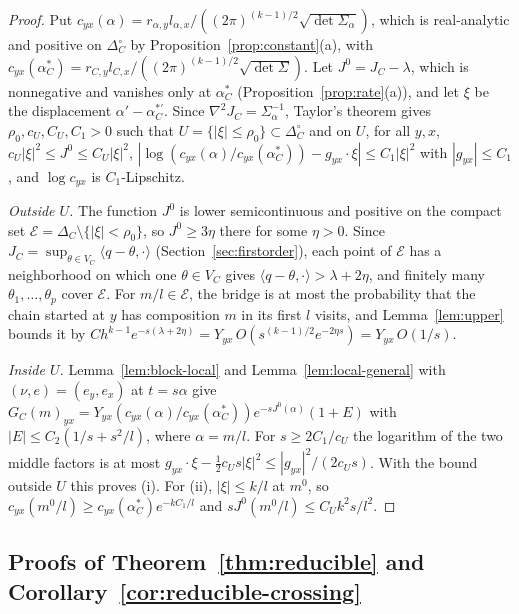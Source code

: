 \begin{proof}
Put $c_{yx}(\alpha)=r_{\alpha,y}l_{\alpha,x}/((2\pi)^{(k-1)/2}\sqrt{\det\Sigma_\alpha})$, which is
real-analytic and positive on $\Delta_C^\circ$ by Proposition~\ref{prop:constant}(a), with
$c_{yx}(\alpha^*_C)=r_{C,y}l_{C,x}/((2\pi)^{(k-1)/2}\sqrt{\det\Sigma})$. Let $J^0=J_C-\lambda$, which is
nonnegative and vanishes only at $\alpha^*_C$ (Proposition~\ref{prop:rate}(a)), and let $\xi$ be
the displacement $\alpha'-\alpha^{*\prime}_C$. Since $\nabla^2J_C=\Sigma_\alpha^{-1}$, Taylor's
theorem gives $\rho_0,c_U,C_U,C_1>0$ such that $U=\{|\xi|\le\rho_0\}\subset\Delta_C^\circ$ and on
$U$, for all $y,x$, $c_U|\xi|^2\le J^0\le C_U|\xi|^2$,
$|\log(c_{yx}(\alpha)/c_{yx}(\alpha^*_C))-g_{yx}\cdot\xi|\le C_1|\xi|^2$ with $|g_{yx}|\le C_1$,
and $\log c_{yx}$ is $C_1$-Lipschitz.

\emph{Outside $U$.} The function $J^0$ is lower semicontinuous and positive on the compact set
$\mathcal E=\Delta_C\setminus\{|\xi|<\rho_0\}$, so $J^0\ge3\eta$ there for some $\eta>0$. Since
$J_C=\sup_{\theta\in V_C}\langle q-\theta,\cdot\rangle$ (Section~\ref{sec:firstorder}), each
point of $\mathcal E$ has a neighborhood on which one $\theta\in V_C$ gives
$\langle q-\theta,\cdot\rangle>\lambda+2\eta$, and finitely many $\theta_1,\dots,\theta_p$ cover
$\mathcal E$. For $m/l\in\mathcal E$, the bridge is at most the probability that the chain started at $y$ has
composition $m$ in its first $l$ visits, and Lemma~\ref{lem:upper} bounds it by
$Ch^{k-1}e^{-s(\lambda+2\eta)}=Y_{yx}\,O(s^{(k-1)/2}e^{-2\eta s})=Y_{yx}\,O(1/s)$.

\emph{Inside $U$.} Lemma~\ref{lem:block-local} and Lemma~\ref{lem:local-general} with
$(\nu,e)=(e_y,e_x)$ at $t=s\alpha$ give
$G_C(m)_{yx}=Y_{yx}(c_{yx}(\alpha)/c_{yx}(\alpha^*_C))e^{-sJ^0(\alpha)}(1+E)$ with
$|E|\le C_2(1/s+s^2/l)$, where $\alpha=m/l$. For $s\ge2C_1/c_U$ the logarithm of the two middle
factors is at most $g_{yx}\cdot\xi-\frac12c_Us|\xi|^2\le|g_{yx}|^2/(2c_Us)$. With the bound outside
$U$ this proves (i). For (ii), $|\xi|\le k/l$ at $m^0$, so $c_{yx}(m^0/l)\ge c_{yx}(\alpha^*_C)e^{-kC_1/l}$
and $sJ^0(m^0/l)\le C_Uk^2s/l^2$.
\end{proof}

\subsection{Proofs of Theorem~\ref{thm:reducible} and Corollary~\ref{cor:reducible-crossing}}

